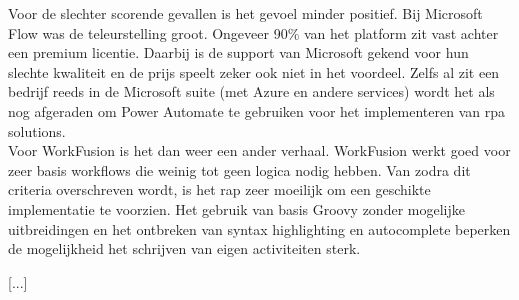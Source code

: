 Voor de slechter scorende gevallen is het gevoel minder positief. Bij Microsoft Flow was de teleurstelling groot. Ongeveer 90\% van het platform zit vast achter een premium licentie. Daarbij is de support van Microsoft gekend voor hun slechte kwaliteit en de prijs speelt zeker ook niet in het voordeel. Zelfs al zit een bedrijf reeds in de Microsoft suite (met Azure en andere services) wordt het als nog afgeraden om Power Automate te gebruiken voor het implementeren van \acrshort{rpa} solutions.\\
Voor WorkFusion is het dan weer een ander verhaal. WorkFusion werkt goed voor zeer basis workflows die weinig tot geen logica nodig hebben. Van zodra dit criteria overschreven wordt, is het rap zeer moeilijk om een geschikte implementatie te voorzien. Het gebruik van basis Groovy zonder mogelijke uitbreidingen en het ontbreken van syntax highlighting en autocomplete beperken de mogelijkheid het schrijven van eigen activiteiten sterk.

[...]